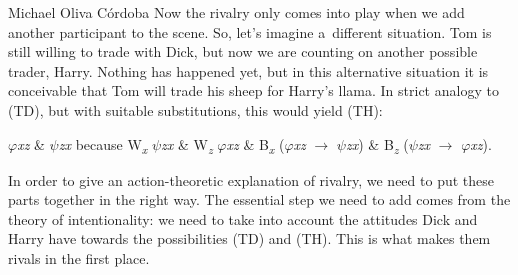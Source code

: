 \begin{artengenv}{Michael Oliva Córdoba}
Now the rivalry only comes into play when we add another participant to the scene. So, let's imagine a~different situation. Tom is still willing to trade with Dick, but now we are counting on another possible trader, Harry. Nothing has happened yet, but in this alternative situation it is conceivable that Tom will trade his sheep for Harry's llama. In strict analogy to (TD), but with suitable substitutions, this would yield (TH):
\vspace{-.09cm}
\begin{description}[font=\normalfont, labelindent=0pt, leftmargin=!, labelwidth=1cm]
  \item[(TH)] \textit{$\varphi $xz} \& \textit{$\psi $zx} because W\textit{\textsubscript{x}} \textit{$\psi $zx} \& W\textit{\textsubscript{z}} \textit{$\varphi $xz} \& B\textit{\textsubscript{x}} (\textit{$\varphi $xz} $\to$ \textit{$\psi $zx}) \& B\textit{\textsubscript{z}} (\textit{$\psi $zx} $\to$ \textit{$\varphi $xz}).
\end{description}
\vspace{-.09cm}

%
%
%
%

\noindent In order to give an action-theoretic explanation of rivalry, we need to put these parts together in the right way. The essential step we need to add comes from the theory of intentionality: we need to take into account the attitudes Dick and Harry have towards the possibilities (TD) and (TH). This is what makes them rivals in the first place.




\end{artengenv}
